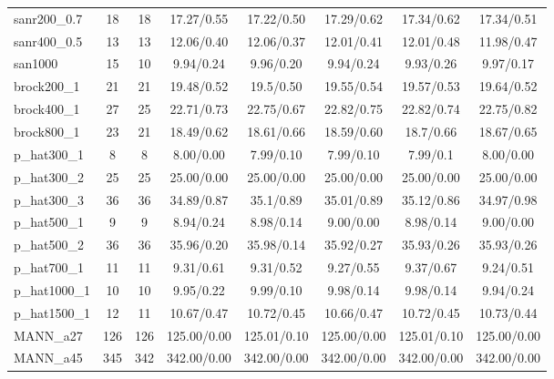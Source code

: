 \documentclass[11pt]{article}
\begin{document}
\begin{table*}[ht!]
\begin{footnotesize}
\begin{center}
\begin{tabular}{|l||c|c||c|c|c|c|c|}
\hline
sanr200\_0.7 	&18 &18  &17.27/0.55 &17.22/0.50 &17.29/0.62 &17.34/0.62 &17.34/0.51\\
sanr400\_0.5 	&13 &13  &12.06/0.40 &12.06/0.37 &12.01/0.41 &12.01/0.48 &11.98/0.47\\
san1000 	    &15 &10  &9.94/0.24 &9.96/0.20 &9.94/0.24 &9.93/0.26 &9.97/0.17\\
\hline
brock200\_1 	&21 &21  &19.48/0.52 &19.5/0.50 &19.55/0.54 &19.57/0.53 &19.64/0.52\\
brock400\_1 	&27 &25  &22.71/0.73 &22.75/0.67 &22.82/0.75 &22.82/0.74 &22.75/0.82\\
brock800\_1 	&23 &21  & 18.49/0.62 &18.61/0.66 &18.59/0.60 &18.7/0.66 &18.67/0.65\\
\hline
p\_hat300\_1 	&8 	&8   &8.00/0.00 &7.99/0.10 &7.99/0.10 &7.99/0.1 &8.00/0.00\\
p\_hat300\_2 	&25	&25  &25.00/0.00 &25.00/0.00 &25.00/0.00 &25.00/0.00 &25.00/0.00\\
p\_hat300\_3 	&36 &36  &34.89/0.87 &35.1/0.89 &35.01/0.89 &35.12/0.86 &34.97/0.98\\
p\_hat500\_1 	&9 	&9   &8.94/0.24 &8.98/0.14 &9.00/0.00 &8.98/0.14 &9.00/0.00 \\
p\_hat500\_2 	&36 &36  &35.96/0.20 &35.98/0.14 &35.92/0.27 &35.93/0.26 &35.93/0.26\\
p\_hat700\_1 	&11 &11  &9.31/0.61 &9.31/0.52 &9.27/0.55 &9.37/0.67 &9.24/0.51\\
p\_hat1000\_1 	&10 &10  &9.95/0.22 &9.99/0.10 &9.98/0.14 &9.98/0.14 &9.94/0.24\\
p\_hat1500\_1 	&12 &11	 &10.67/0.47 &10.72/0.45 &10.66/0.47 &10.72/0.45 &10.73/0.44\\
\hline
MANN\_a27 	&126 &126 &125.00/0.00 &125.01/0.10 &125.00/0.00 &125.01/0.10 &125.00/0.00\\
MANN\_a45 	&345 &342 &342.00/0.00 &342.00/0.00 &342.00/0.00 &342.00/0.00 &342.00/0.00 \\
\hline
\end{tabular}
\end{center}
\end{footnotesize}
\end{table*}
\linespread{1.3}
\end{document}
